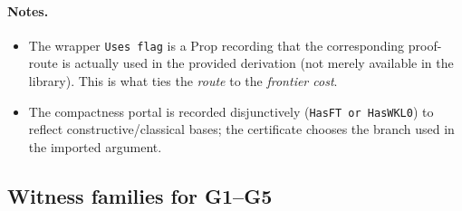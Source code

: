 \documentclass[11pt]{article}
\theoremstyle{definition}
\theoremstyle{remark}
\begin{document}
\paragraph{Notes.}
\begin{itemize}
\item The wrapper \verb|Uses flag| is a Prop recording that the corresponding proof-route is actually used in the provided derivation (not merely available in the library). This is what ties the \emph{route} to the \emph{frontier cost}.
\item The compactness portal is recorded disjunctively (\verb|HasFT or HasWKL0|) to reflect constructive/classical bases; the certificate chooses the branch used in the imported argument.
\end{itemize}

\subsection{Witness families for G1--G5}\label{app:witnesses}
\end{document}
